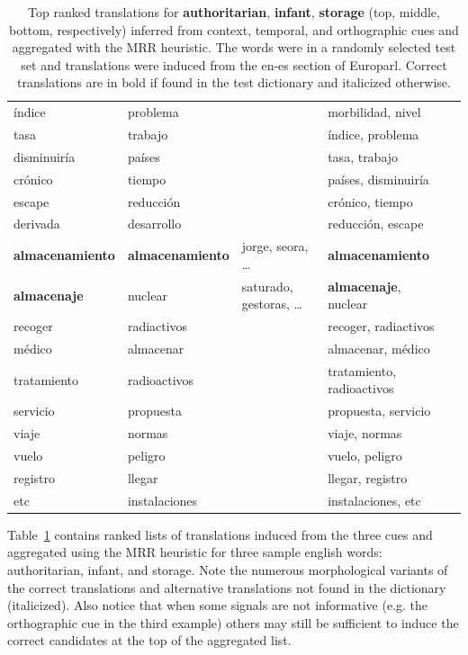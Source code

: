 \documentclass{article}
\newcommand{\tabref}[1]{Table~\ref{#1}}
\begin{document}
\begin{table}[h!]
\begin{center}
\begin{tabular}{lllll}
índice	&	problema	&	&	morbilidad, nivel\\
tasa	&	trabajo	&	&	índice, problema\\
disminuiría	&	países	&	&	tasa, trabajo\\
cr\'{o}nico	&	tiempo	&	&	países, disminuiría\\
escape	&	reducci\'{o}n	&	&	 cr\'{o}nico, tiempo\\
derivada	&	desarrollo	&	&	reducci\'{o}n, escape\\
\hline
{\bf almacenamiento}	&	{\bf almacenamiento}	&	jorge, seora, \dots	&	{\bf almacenamiento}\\
{\bf almacenaje}	&	nuclear	&	saturado, gestoras, \dots	&	{\bf almacenaje}, nuclear\\
recoger	&	radiactivos	&	&	recoger, radiactivos\\
m\'{e}dico	&	almacenar	&	&	almacenar, m\'{e}dico\\
tratamiento	&	radioactivos	&	&	tratamiento, radioactivos\\
servicio	&	propuesta	&	&	propuesta, servicio\\
viaje	&	normas	&	&	viaje, normas\\
vuelo	&	peligro	&	&	vuelo, peligro\\
registro	&	llegar	&	&	llegar, registro\\
etc	&	instalaciones	&	&	instalaciones, etc\\
\end{tabular}
\end{center}
\normalsize
\caption{Top ranked translations for {\bf authoritarian}, {\bf infant}, {\bf storage} (top, middle, bottom, respectively) inferred from context, temporal, and orthographic cues and aggregated with the MRR heuristic.  The words were in a randomly selected test set and translations were induced from the en-es section of Europarl. Correct translations are in bold if found in the test dictionary and italicized otherwise.}
\label{fig:examplelists}
\end{table}

\tabref{fig:examplelists} contains ranked lists of translations induced from the three cues and aggregated using the MRR heuristic for three sample english words: authoritarian, infant, and storage.  Note the numerous morphological variants of the correct translations and alternative translations not found in the dictionary (italicized).  Also notice that when some signals are not informative (e.g. the orthographic cue in the third example) others may still be sufficient to induce the correct candidates at the top of the aggregated list.
\end{document}
